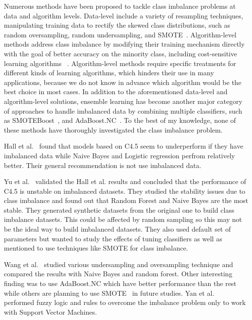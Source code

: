 \documentclass[sigconf,review, anonymous]{acmart}
\theoremstyle{break}
\begin{document}
Numerous methods have been proposed to tackle class
imbalance problems at data and algorithm levels. Data-level include a variety of resampling techniques, manipulating training data to rectify the skewed class distributions, such as random oversampling, random undersampling, and SMOTE~\cite{estabrooks2004multiple}. Algorithm-level methods address class imbalance by
modifying their training mechanism directly with the 
goal of better accuracy on the minority class, including cost-sensitive learning algorithms ~\cite{he2009learning}.
Algorithm-level methods require specific treatments for different
kinds of learning algorithms, which hinders their use
in many applications, because we do not know in advance
which algorithm would be the best choice in most cases. In addition to the aforementioned data-level and algorithm-level solutions, ensemble learning has become another major category of approaches to handle imbalanced data by combining multiple classifiers, such as SMOTEBoost~\cite{chawla2003smoteboost}, and
AdaBoost.NC~\cite{wang2010negative}. To 
the best of my knowledge, none of these methods have  thoroughly investigated the class imbalance problem.

Hall et al.~\cite{hall2012systematic} found that models based on C4.5 seem to underperform if they have imbalanced data while Naive Bayes and Logistic regression perfrom relatively better. 
Their general recommendation is not use
imbalanced data.  

Yu et al.~\cite{yuperformance} validated the Hall et al. results and concluded that the
performance of C4.5 is unstable on imbalanced datasets. They studied the stability issues due to  class imbalance and found out that Random Forest and Naive Bayes are the most stable. They generated synthetic datasets from the original one to build class imbalance datasets. This could be affected by random sampling 
so this may not be the ideal way to build imbalanced datasets. They also used default set of parameters but wanted to study the effects of tuning classifiers as well as mentioned to use techniques like SMOTE for class imbalance.

Wang et al.~\cite{wang2013using} studied various undersampling and oversampling technique and compared the results with Naive Bayes and random forest. Other interesting finding was to use AdaBoost.NC which have better performance than the rest while others are planning to use SMOTE~\cite{gray2009using} in future studies. Yan et al.~\cite{yan2010software} performed fuzzy logic and rules to overcome the imbalance problem only to work with Support Vector Machines. 
\end{document}
